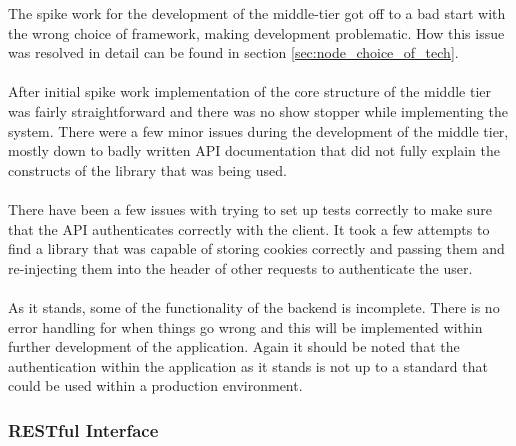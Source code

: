 The spike work for the development of the middle-tier got off to a bad start with the wrong choice of framework, making development problematic. How this issue was resolved in detail can be found in section \ref{sec:node_choice_of_tech}.\\
\\
After initial spike work implementation of the core structure of the middle tier was fairly straightforward and there was no show stopper while implementing the system. There were a few minor issues during the development of the middle tier, mostly down to badly written API documentation that did not fully explain the constructs of the library that was being used.\\
\\
There have been a few issues with trying to set up tests correctly to make sure that the API authenticates correctly with the client. It took a few attempts to find a library that was capable of storing cookies correctly and passing them and re-injecting them into the header of other requests to authenticate the user.\\
\\
As it stands, some of the functionality of the backend is incomplete. There is no error handling for when things go wrong and this will be implemented within further development of the application. Again it should be noted that the authentication within the application as it stands is not up to a standard that could be used within a production environment.
\\

\subsubsection{RESTful Interface}

